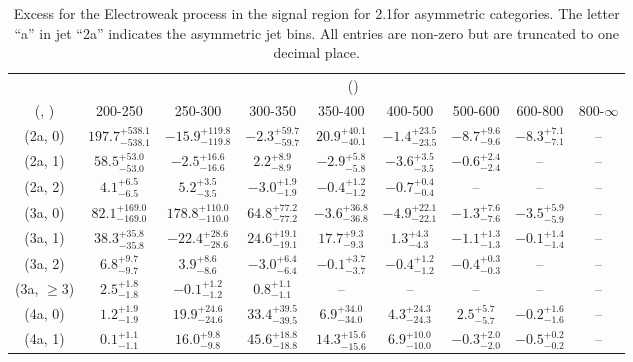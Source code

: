 \begin{table}[h!]
\tiny
\centering
\caption{Excess for the Electroweak process in the signal region for 2.1\ifb for asymmetric categories. The letter ``a'' in jet \eg ``2a''  indicates the asymmetric jet bins. All entries are non-zero but are truncated to one decimal place.\label{tab:excesssep_sig_ewk_asym}}
\begin{tabular}
{ccccccccc}
	\hline\hline
	& \multicolumn{8}{c}{\scalht (\gev)} \\ 
	 (\njet,  \nb) & 200-250 & 250-300 & 300-350 & 350-400 & 400-500 & 500-600 & 600-800 & 800-$\infty$ \\ [0.8ex] 
\hline
	(2a, 0) & $197.7^{+ 538.1 }_{- 538.1 }$ & $-15.9^{+ 119.8 }_{- 119.8 }$ & $-2.3^{+ 59.7 }_{- 59.7 }$ & $20.9^{+ 40.1 }_{- 40.1 }$ & $-1.4^{+ 23.5 }_{- 23.5 }$ & $-8.7^{+ 9.6 }_{- 9.6 }$ & $-8.3^{+ 7.1 }_{- 7.1 }$ & -- \\[0.5ex] 
	(2a, 1) & $58.5^{+ 53.0 }_{- 53.0 }$ & $-2.5^{+ 16.6 }_{- 16.6 }$ & $2.2^{+ 8.9 }_{- 8.9 }$ & $-2.9^{+ 5.8 }_{- 5.8 }$ & $-3.6^{+ 3.5 }_{- 3.5 }$ & $-0.6^{+ 2.4 }_{- 2.4 }$ & -- & -- \\[0.5ex] 
	(2a, 2) & $4.1^{+ 6.5 }_{- 6.5 }$ & $5.2^{+ 3.5 }_{- 3.5 }$ & $-3.0^{+ 1.9 }_{- 1.9 }$ & $-0.4^{+ 1.2 }_{- 1.2 }$ & $-0.7^{+ 0.4 }_{- 0.4 }$ & -- & -- & -- \\[0.5ex] 
	(3a, 0) & $82.1^{+ 169.0 }_{- 169.0 }$ & $178.8^{+ 110.0 }_{- 110.0 }$ & $64.8^{+ 77.2 }_{- 77.2 }$ & $-3.6^{+ 36.8 }_{- 36.8 }$ & $-4.9^{+ 22.1 }_{- 22.1 }$ & $-1.3^{+ 7.6 }_{- 7.6 }$ & $-3.5^{+ 5.9 }_{- 5.9 }$ & -- \\[0.5ex] 
	(3a, 1) & $38.3^{+ 35.8 }_{- 35.8 }$ & $-22.4^{+ 28.6 }_{- 28.6 }$ & $24.6^{+ 19.1 }_{- 19.1 }$ & $17.7^{+ 9.3 }_{- 9.3 }$ & $1.3^{+ 4.3 }_{- 4.3 }$ & $-1.1^{+ 1.3 }_{- 1.3 }$ & $-0.1^{+ 1.4 }_{- 1.4 }$ & -- \\[0.5ex] 
	(3a, 2) & $6.8^{+ 9.7 }_{- 9.7 }$ & $3.9^{+ 8.6 }_{- 8.6 }$ & $-3.0^{+ 6.4 }_{- 6.4 }$ & $-0.1^{+ 3.7 }_{- 3.7 }$ & $-0.4^{+ 1.2 }_{- 1.2 }$ & $-0.4^{+ 0.3 }_{- 0.3 }$ & -- & -- \\[0.5ex] 
	(3a, $\ge3$) & $2.5^{+ 1.8 }_{- 1.8 }$ & $-0.1^{+ 1.2 }_{- 1.2 }$ & $0.8^{+ 1.1 }_{- 1.1 }$ & -- & -- & -- & -- & -- \\[0.5ex] 
	(4a, 0) & $1.2^{+ 1.9 }_{- 1.9 }$ & $19.9^{+ 24.6 }_{- 24.6 }$ & $33.4^{+ 39.5 }_{- 39.5 }$ & $6.9^{+ 34.0 }_{- 34.0 }$ & $4.3^{+ 24.3 }_{- 24.3 }$ & $2.5^{+ 5.7 }_{- 5.7 }$ & $-0.2^{+ 1.6 }_{- 1.6 }$ & -- \\[0.5ex] 
	(4a, 1) & $0.1^{+ 1.1 }_{- 1.1 }$ & $16.0^{+ 9.8 }_{- 9.8 }$ & $45.6^{+ 18.8 }_{- 18.8 }$ & $14.3^{+ 15.6 }_{- 15.6 }$ & $6.9^{+ 10.0 }_{- 10.0 }$ & $-0.3^{+ 2.0 }_{- 2.0 }$ & $-0.5^{+ 0.2 }_{- 0.2 }$ & -- \\[0.5ex] 

\end{tabular}
\end{table}
